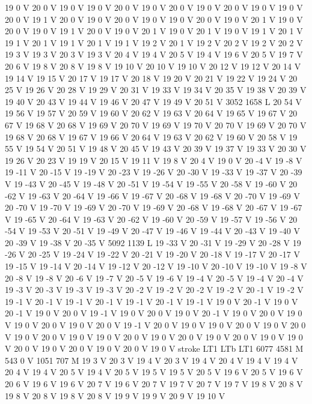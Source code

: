 {{19 0 V
20 0 V
19 0 V
19 0 V
20 0 V
19 0 V
20 0 V
19 0 V
20 0 V
19 0 V
19 0 V
20 0 V
19 1 V
20 0 V
19 0 V
20 0 V
19 0 V
19 0 V
20 0 V
19 0 V
20 1 V
19 0 V
20 0 V
19 0 V
19 1 V
20 0 V
19 0 V
20 1 V
19 0 V
20 1 V
19 0 V
19 1 V
20 1 V
19 1 V
20 1 V
19 1 V
20 1 V
19 1 V
19 2 V
20 1 V
19 2 V
20 2 V
19 2 V
20 2 V
19 3 V
19 3 V
20 3 V
19 3 V
20 4 V
19 4 V
20 5 V
19 4 V
19 6 V
20 5 V
19 7 V
20 6 V
19 8 V
20 8 V
19 8 V
19 10 V
20 10 V
19 10 V
20 12 V
19 12 V
20 14 V
19 14 V
19 15 V
20 17 V
19 17 V
20 18 V
19 20 V
20 21 V
19 22 V
19 24 V
20 25 V
19 26 V
20 28 V
19 29 V
20 31 V
19 33 V
19 34 V
20 35 V
19 38 V
20 39 V
19 40 V
20 43 V
19 44 V
19 46 V
20 47 V
19 49 V
20 51 V
3052 1658 L
20 54 V
19 56 V
19 57 V
20 59 V
19 60 V
20 62 V
19 63 V
20 64 V
19 65 V
19 67 V
20 67 V
19 68 V
20 68 V
19 69 V
20 70 V
19 69 V
19 70 V
20 70 V
19 69 V
20 70 V
19 68 V
20 68 V
19 67 V
19 66 V
20 64 V
19 63 V
20 62 V
19 60 V
20 58 V
19 55 V
19 54 V
20 51 V
19 48 V
20 45 V
19 43 V
20 39 V
19 37 V
19 33 V
20 30 V
19 26 V
20 23 V
19 19 V
20 15 V
19 11 V
19 8 V
20 4 V
19 0 V
20 -4 V
19 -8 V
19 -11 V
20 -15 V
19 -19 V
20 -23 V
19 -26 V
20 -30 V
19 -33 V
19 -37 V
20 -39 V
19 -43 V
20 -45 V
19 -48 V
20 -51 V
19 -54 V
19 -55 V
20 -58 V
19 -60 V
20 -62 V
19 -63 V
20 -64 V
19 -66 V
19 -67 V
20 -68 V
19 -68 V
20 -70 V
19 -69 V
20 -70 V
19 -70 V
19 -69 V
20 -70 V
19 -69 V
20 -68 V
19 -68 V
20 -67 V
19 -67 V
19 -65 V
20 -64 V
19 -63 V
20 -62 V
19 -60 V
20 -59 V
19 -57 V
19 -56 V
20 -54 V
19 -53 V
20 -51 V
19 -49 V
20 -47 V
19 -46 V
19 -44 V
20 -43 V
19 -40 V
20 -39 V
19 -38 V
20 -35 V
5092 1139 L
19 -33 V
20 -31 V
19 -29 V
20 -28 V
19 -26 V
20 -25 V
19 -24 V
19 -22 V
20 -21 V
19 -20 V
20 -18 V
19 -17 V
20 -17 V
19 -15 V
19 -14 V
20 -14 V
19 -12 V
20 -12 V
19 -10 V
20 -10 V
19 -10 V
19 -8 V
20 -8 V
19 -8 V
20 -6 V
19 -7 V
20 -5 V
19 -6 V
19 -4 V
20 -5 V
19 -4 V
20 -4 V
19 -3 V
20 -3 V
19 -3 V
19 -3 V
20 -2 V
19 -2 V
20 -2 V
19 -2 V
20 -1 V
19 -2 V
19 -1 V
20 -1 V
19 -1 V
20 -1 V
19 -1 V
20 -1 V
19 -1 V
19 0 V
20 -1 V
19 0 V
20 -1 V
19 0 V
20 0 V
19 -1 V
19 0 V
20 0 V
19 0 V
20 -1 V
19 0 V
20 0 V
19 0 V
19 0 V
20 0 V
19 0 V
20 0 V
19 -1 V
20 0 V
19 0 V
19 0 V
20 0 V
19 0 V
20 0 V
19 0 V
20 0 V
19 0 V
19 0 V
20 0 V
19 0 V
20 0 V
19 0 V
20 0 V
19 0 V
19 0 V
20 0 V
19 0 V
20 0 V
19 0 V
20 0 V
19 0 V
stroke
LT1
LTb
LT1
6077 4581 M
543 0 V
1051 707 M
19 3 V
20 3 V
19 4 V
20 3 V
19 4 V
20 4 V
19 4 V
19 4 V
20 4 V
19 4 V
20 5 V
19 4 V
20 5 V
19 5 V
19 5 V
20 5 V
19 6 V
20 5 V
19 6 V
20 6 V
19 6 V
19 6 V
20 7 V
19 6 V
20 7 V
19 7 V
20 7 V
19 7 V
19 8 V
20 8 V
19 8 V
20 8 V
19 8 V
20 8 V
19 9 V
19 9 V
20 9 V
19 10 V
}}
